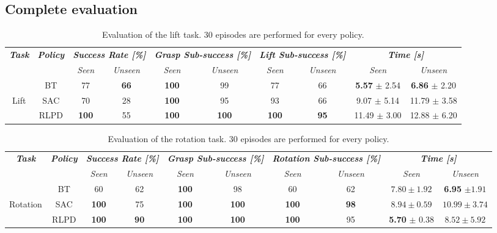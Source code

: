 \documentclass[letterpaper, 10 pt, conference]{ieeeconf}  %
\begin{document}
\subsection{Complete evaluation}

\begin{table}[t]
    \centering
    \caption{Evaluation of the lift task. 30 episodes are performed for every policy.}
    \renewcommand{\arraystretch}{1.5}
    \begin{tabular}{c|c|cc|cc|cc|cc}
        \toprule \textbf{\textit{Task}} & \textbf{\textit{Policy}} & \multicolumn{2}{c|}{\textit{\textbf{Success Rate [\%]}}} & \multicolumn{2}{c|}{\textit{\textbf{Grasp Sub-success [\%]}}} & \multicolumn{2}{c|}{\textit{\textbf{Lift Sub-success [\%]}}} & \multicolumn{2}{c}{\textit{\textbf{Time [s]}}}\\
        & & \textit{Seen} & \textit{Unseen} & \textit{Seen} & \textit{Unseen} & \textit{Seen} & \textit{Unseen} & \textit{Seen} & \textit{Unseen} \\
        \midrule & BT & 77 & \textbf{66} & \textbf{100} & 99 & 77 & 66 & \textbf{5.57} $\pm$ 2.54 & \textbf{6.86} $\pm$ 2.20 \\
        Lift & SAC & 70 & 28 & \textbf{100} & 95 & 93 & 66 & 9.07 $\pm$ 5.14 & 11.79 $\pm$ 3.58 \\
         & RLPD & \textbf{100} & 55 & \textbf{100} & \textbf{100} & \textbf{100} & \textbf{95} & 11.49 $\pm$ 3.00 & 12.88 $\pm$ 6.20 \\
        \bottomrule
    \end{tabular}
    \label{lift_eval}
\end{table}

\begin{table}[t]
    \centering
    \caption{Evaluation of the rotation task. 30 episodes are performed for every policy.}
    \renewcommand{\arraystretch}{1.5}
    \begin{tabular}{c|c|cc|cc|cc|cc}
        \toprule \textit{\textbf{Task}} & \textit{\textbf{Policy}} & \multicolumn{2}{c|}{\textit{\textbf{Success Rate [\%]}}} & \multicolumn{2}{c|}{\textit{\textbf{Grasp Sub-success [\%]}}} & \multicolumn{2}{c|}{\textit{\textbf{Rotation Sub-success [\%]}}} & \multicolumn{2}{c}{\textit{\textbf{Time [s]}}} \\
        & & \textit{Seen} & \textit{Unseen} & \textit{Seen} & \textit{Unseen} & \textit{Seen} & \textit{Unseen} & \textit{Seen} & \textit{Unseen} \\
        \midrule
        & BT & 60 & 62 & \textbf{100} & 98 & 60 & 62 & $7.80 \pm 1.92$ & \textbf{6.95} $\pm 1.91$ \\
        Rotation & SAC & \textbf{100} & 75 & \textbf{100} & \textbf{100} & \textbf{100} & \textbf{98} & $8.94 \pm 0.59$ & $10.99 \pm 3.74$ \\
        & RLPD & \textbf{100} & \textbf{90} & \textbf{100} & \textbf{100} & \textbf{100} & 95 & \textbf{5.70} $\pm$ 0.38 & $8.52 \pm 5.92$ \\
        \bottomrule
    \end{tabular}
    \label{rot_eval}
\end{table}
\end{document}
